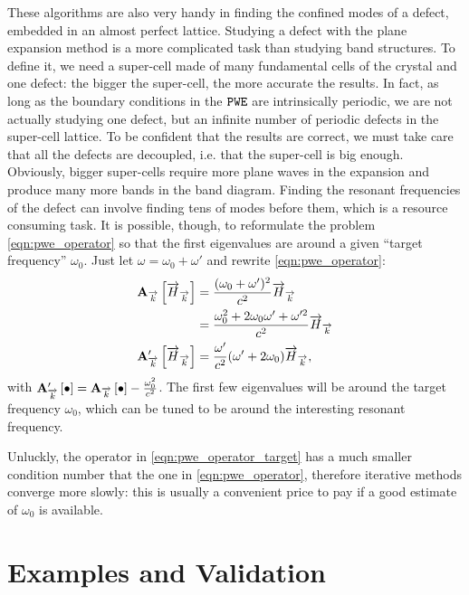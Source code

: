 These algorithms are also very handy in finding the confined modes of
a defect, embedded in an almost perfect lattice. Studying a defect
with the plane expansion method is a more complicated task than
studying band structures. To define it, we need a super-cell made of
many fundamental cells of the crystal and one defect: the bigger the
super-cell, the more accurate the results. In fact, as long as the
boundary conditions in the $\texttt{PWE}$ are intrinsically periodic, we are
not actually studying one defect, but an infinite number of periodic
defects in the super-cell lattice. To be confident that the results are
correct, we must take care that all the defects are decoupled,
i.e. that the super-cell is big enough. Obviously, bigger super-cells
require more plane waves in the expansion and produce many more
bands in the band diagram. Finding the resonant frequencies of the
defect can involve finding tens of modes before them, which is a
resource consuming task. It is possible, though, to reformulate the
problem \ref{eqn:pwe_operator} so that the first eigenvalues are
around a given ``target frequency'' $\omega_0$. Just let $\omega =
\omega_0 + \omega'$ and rewrite \ref{eqn:pwe_operator}:
\begin{equation} \label{eqn:pwe_operator_target} \begin{aligned}
  \mathbf{A_{\overrightarrow{k}}}\left[\overrightarrow{H}_{\overrightarrow{k}}\right]  & = \frac{(\omega_0 + \omega')^2}{c^2} \overrightarrow{H}_{\overrightarrow{k}} \nonumber \\
                              & = \frac{\omega_0^2 + 2 \omega_0 \omega' + \omega'^2}{c^2} \overrightarrow{H}_{\overrightarrow{k}} \nonumber \\
  \mathbf{A'_{\overrightarrow{k}}}\left[\overrightarrow{H}_{\overrightarrow{k}}\right] & = \frac{\omega'}{c^2}(\omega' + 2 \omega_0) \overrightarrow{H}_{\overrightarrow{k}},
\end{aligned} \end{equation}
with $\mathbf{A'_{\overrightarrow{k}}}\left[\bullet\right] = \mathbf{A_{\overrightarrow{k}}}\left[\bullet\right] -
\frac{\omega_0^2}{c^2}$. The first few eigenvalues will be around the
target frequency $\omega_0$, which can be tuned to be around the
interesting resonant frequency.

Unluckly, the operator in \ref{eqn:pwe_operator_target} has a much
smaller condition number that the one in \ref{eqn:pwe_operator},
therefore iterative methods converge more slowly: this is usually a
convenient price to pay if a good estimate of $\omega_0$ is available.

\section{Examples and Validation}


